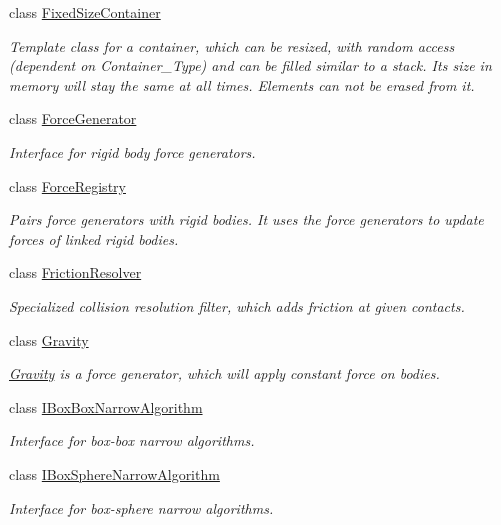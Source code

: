\begin{DoxyCompactItemize}
class \mbox{\hyperlink{classr3_1_1_fixed_size_container}{Fixed\+Size\+Container}}
\begin{DoxyCompactList}\small\item\em Template class for a container, which can be resized, with random access (dependent on Container\+\_\+\+Type) and can be filled similar to a stack. Its size in memory will stay the same at all times. Elements can not be erased from it. \end{DoxyCompactList}\item 
class \mbox{\hyperlink{classr3_1_1_force_generator}{Force\+Generator}}
\begin{DoxyCompactList}\small\item\em Interface for rigid body force generators. \end{DoxyCompactList}\item 
class \mbox{\hyperlink{classr3_1_1_force_registry}{Force\+Registry}}
\begin{DoxyCompactList}\small\item\em Pairs force generators with rigid bodies. It uses the force generators to update forces of linked rigid bodies. \end{DoxyCompactList}\item 
class \mbox{\hyperlink{classr3_1_1_friction_resolver}{Friction\+Resolver}}
\begin{DoxyCompactList}\small\item\em Specialized collision resolution filter, which adds friction at given contacts. \end{DoxyCompactList}\item 
class \mbox{\hyperlink{classr3_1_1_gravity}{Gravity}}
\begin{DoxyCompactList}\small\item\em \mbox{\hyperlink{classr3_1_1_gravity}{Gravity}} is a force generator, which will apply constant force on bodies. \end{DoxyCompactList}\item 
class \mbox{\hyperlink{classr3_1_1_i_box_box_narrow_algorithm}{I\+Box\+Box\+Narrow\+Algorithm}}
\begin{DoxyCompactList}\small\item\em Interface for box-\/box narrow algorithms. \end{DoxyCompactList}\item 
class \mbox{\hyperlink{classr3_1_1_i_box_sphere_narrow_algorithm}{I\+Box\+Sphere\+Narrow\+Algorithm}}
\begin{DoxyCompactList}\small\item\em Interface for box-\/sphere narrow algorithms. \end{DoxyCompactList}\item 

\end{DoxyCompactItemize}
